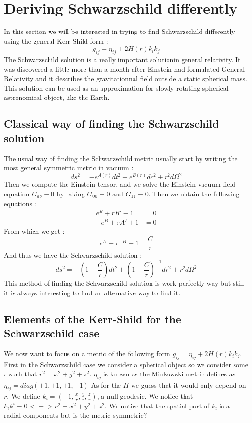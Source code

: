 \documentclass[a4paper,12pt]{article}
\theoremstyle{definition}
\begin{document}
\section{Deriving Schwarzschild differently}
In this section we will be interested in trying to find Schwarzschild differently using the general Kerr-Shild form :
\begin{equation*}
	g_{ij}=\eta_{ij}+2H(r)k_ik_j
\end{equation*}
The Schwarzschild solution is a really important solutionin general relativity. It was discovered a little more than a month after Einstein had formulated General Relativity and it describes the gravitationnal field outside a static spherical mass.
This solution can be used as an approximation for slowly rotating spherical astronomical object, like the Earth.
\subsection{Classical way of finding the Schwarzschild solution}
The usual way of finding the Schwarzschild metric usually start by writing the most general symmetric metric in vacuum :
\begin{equation*}
	ds^2=-e^{A(r)}dt^2+e^{B(r)}dr^2+r^2d\Omega^2
\end{equation*}
Then we compute the Einstein tensor, and we solve the Einstein vacuum field equation $G_{ab}=0$ by taking $G_{00}=0$ and $G_{11}=0$. Then we obtain the following equations :
\begin{align*}
	e^B+rB'-1&=0\\
	-e^B+rA'+1&=0
\end{align*}
From which we get :
\begin{equation*}
	e^A=e^{-B}=1-\frac{C}{r}
\end{equation*}
And thus we have the Schwarzschild solution :
\begin{equation*}
	ds^2=-(1-\frac{C}{r})dt^2+(1-\frac{C}{r})^{-1}dr^2+r^2d\Omega^2
\end{equation*}
This method of finding the Schwarzschild solution is work perfectly way but still it is always interesting to find an alternative way to find it.
\subsection{Elements of the Kerr-Shild for the Schwarzschild case}
We now want to focus on a metric of the following form $g_{ij}=\eta_{ij}+2H(r)k_ik_j$.
First in the Schwarzschild case we consider a spherical object so we consider some $r$ such that $r^2=x^2+y^2+z^2$.
$\eta_{ij}$ is known as the Minkowski metric defines as $\eta_{ij}=diag(+1,+1,+1,-1)$
As for the $H$ we guess that it would only depend on $r$.
We define $k_i=(-1,\frac{x}{r},\frac{y}{r},\frac{z}{r})$, a null geodesic.
We notice that $k_ik^i=0 <=> r^2=x^2+y^2+z^2$.
We notice that the spatial part of $k_i$ is a radial components but is the metric symmetric?
\end{document}
